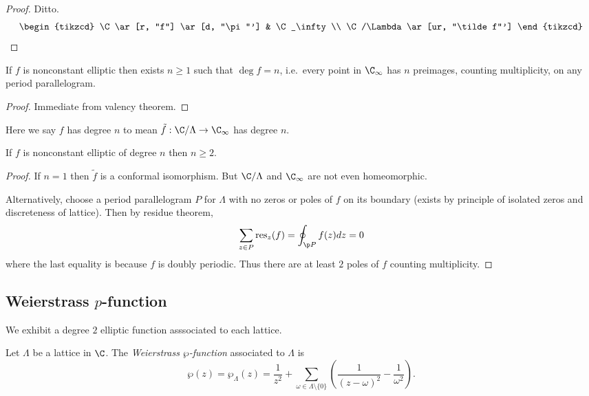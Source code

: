 \documentclass[a4paper]{article}
\begin{document}
\begin{proof}
  Ditto.
  \[
    \begin{tikzcd}
      \C \ar[r, "f"] \ar[d, "\pi"'] & \C_\infty \\
      \C/\Lambda \ar[ur, "\tilde f"']
    \end{tikzcd}
  \]
\end{proof}

\begin{corollary}
  If \(f\) is nonconstant elliptic then exists \(n \geq 1\) such that \(\deg f = n\), i.e.\ every point in \(\C_\infty\) has \(n\) preimages, counting multiplicity, on any period parallelogram.
\end{corollary}

\begin{proof}
  Immediate from valency theorem.
\end{proof}

Here we say \(f\) has degree \(n\) to mean \(\tilde f: \C/\Lambda \to \C_\infty\) has degree \(n\).

\begin{corollary}
  If \(f\) is nonconstant elliptic of degree \(n\) then \(n \geq 2\).
\end{corollary}

\begin{proof}
  If \(n = 1\) then \(\tilde f\) is a conformal isomorphism. But \(\C/\Lambda\) and \(\C_\infty\) are not even homeomorphic.

  Alternatively, choose a period parallelogram \(P\) for \(\Lambda\) with no zeros or poles of \(f\) on its boundary (exists by principle of isolated zeros and discreteness of lattice). Then by residue theorem,
  \[
    \sum_{z \in P} \operatorname{res}_z(f) = \oint_{\p P} f(z) dz = 0
  \]
  where the last equality is because \(f\) is doubly periodic. Thus there are at least \(2\) poles of \(f\) counting multiplicity.
\end{proof}

\subsection{Weierstrass \(p\)-function}

We exhibit a degree \(2\) elliptic function asssociated to each lattice.

\begin{definition}
  Let \(\Lambda\) be a lattice in \(\C\). The \emph{Weierstrass \(\wp\)-function} associated to \(\Lambda\) is
  \[
    \wp(z) = \wp_\Lambda(z) = \frac{1}{z^2} + \sum_{\omega \in \Lambda \setminus \{0\}} \left( \frac{1}{(z - \omega)^2} - \frac{1}{\omega^2} \right).
  \]
\end{definition}
\end{document}
